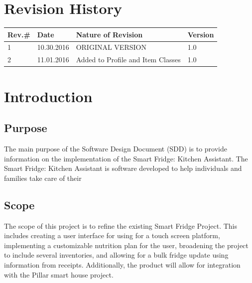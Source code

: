 \setcounter{tocdepth}{2}
\titleformat{\subsubsection}[runin]
{\normalfont\normalsize\bfseries}{\thesubsubsection}{1em}{}


\pagestyle{empty} %

\titleGM %
\tableofcontents
\vfill
\section*{Revision History}
{\ttfamily\begin{center}
		\begin{tabular*}{\textwidth}{ m{4em} m{5em} m{25em} m{4em}  }		
			\toprule			
			Rev.\# & Date & Nature of Revision & Version \\
			\bottomrule
			\toprule
			1 & 10.30.2016 & ORIGINAL VERSION & 1.0\\
			2 & 11.01.2016 & Added to  Profile and Item Classes & 1.0\\
			\hline		
		\end{tabular*}
	\end{center}
}
\pagebreak

\section{Introduction}

\subsection{Purpose}
The main purpose of the Software Design Document (SDD) is to provide information on the implementation of the Smart Fridge: Kitchen Assistant. The Smart Fridge: Kitchen Assistant is software developed to help individuals and families take care of their 

\subsection{Scope} The scope of this project is to refine the existing Smart Fridge Project. This includes creating a user interface for using for a touch screen platform, implementing a customizable nutrition plan for the user, broadening the project to include several inventories, and allowing for a bulk fridge update using information from receipts. Additionally, the product will allow for integration with the Pillar smart house project.

